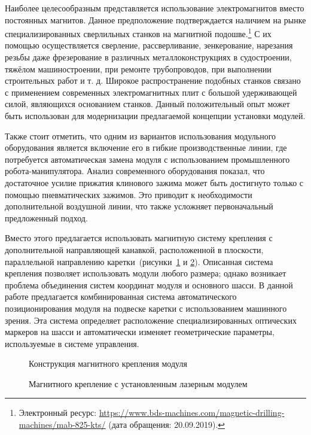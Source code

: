Наиболее целесообразным представляется использование электромагнитов вместо постоянных магнитов. Данное предположение подтверждается наличием на рынке специализированных сверлильных станков на магнитной подошве.\footnote{Электронный ресурс: {\tiny\url{https://www.bds-machines.com/magnetic-drilling-machines/mab-825-kts/}} (дата обращения: 20.09.2019).} С их помощью осуществляется сверление, рассверливание, зенкерование, нарезания резьбы даже фрезерование в различных металлоконструкциях в судостроении, тяжёлом машиностроении, при ремонте трубопроводов, при выполнении строительных работ и т. д. Широкое распространение подобных станков связано с применением современных электромагнитных плит с большой удерживающей силой, являющихся основанием станков. Данный положительный опыт может быть использован для модернизации предлагаемой концепции установки модулей.

Также стоит отметить, что одним из вариантов использования модульного оборудования является включение его в гибкие производственные линии, где потребуется автоматическая замена модуля с использованием промышленного робота-манипулятора. Анализ современного оборудования показал, что достаточное усилие прижатия клинового зажима может быть достигнуто только с помощью пневматических зажимов. Это приводит к необходимости дополнительной воздушной линии, что также усложняет первоначальный предложенный подход.

Вместо этого предлагается использовать магнитную систему крепления с дополнительной направляющей канавкой, расположенной в плоскости, параллельной направлению каретки~(рисунки~\cref{fig:quick-mount} и \cref{fig:quick-mount-1}). Описанная система крепления позволяет использовать модули любого размера; однако возникает проблема объединения систем координат модуля и основного шасси. В данной работе предлагается комбинированная система автоматического позиционирования модуля на подвеске каретки с использованием машинного зрения. Эта система определяет расположение специализированных оптических маркеров на шасси и автоматически изменяет геометрические параметры, используемые в системе управления.

\begin{figure}[ht]
	\caption{Конструкция магнитного крепления модуля}\label{fig:quick-mount}
\end{figure}

\begin{figure}[ht]
	\caption{Магнитного крепление с установленным лазерным модулем}\label{fig:quick-mount-1}
\end{figure}

